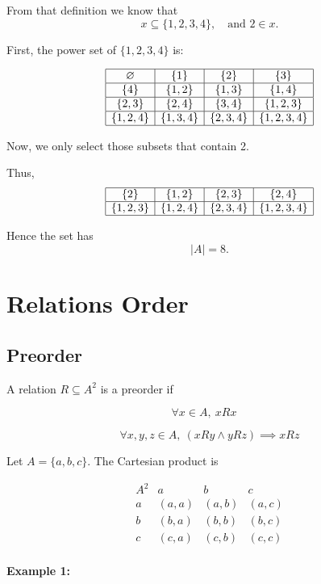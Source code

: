 \documentclass[12pt,a4paper,openany]{article}
\begin{document}
From that definition we know that  
\[
x \subseteq \{1,2,3,4\}, \quad \text{and } 2 \in x.
\]  

First, the power set of $\{1,2,3,4\}$ is:

\[
\begin{array}{|c|c|c|c|}
\hline
\varnothing & \{1\} & \{2\} & \{3\} \\ \hline
\{4\} & \{1,2\} & \{1,3\} & \{1,4\} \\ \hline
\{2,3\} & \{2,4\} & \{3,4\} & \{1,2,3\} \\ \hline
\{1,2,4\} & \{1,3,4\} & \{2,3,4\} & \{1,2,3,4\} \\ \hline
\end{array}
\]

Now, we only select those subsets that contain 2.  

Thus,  
\[
\begin{array}{|c|c|c|c|}
\hline
\{2\} & \{1,2\} & \{2,3\} & \{2,4\} \\ \hline
\{1,2,3\} & \{1,2,4\} & \{2,3,4\} & \{1,2,3,4\} \\ \hline
\end{array}
\]

Hence the set has  
\[
\boxed{|A| = 8.}
\]

\section{Relations Order }

\subsection{Preorder}

A relation $R \subseteq A^2$ is a preorder if

$$
\forall x \in A, \ xRx \quad
$$

$$
\forall x,y,z \in A, \ (xRy \land yRz) \implies xRz
$$

Let $A = \{a,b,c\}$. The Cartesian product is

$$
\begin{array}{c|ccc}
A^2 & a & b & c \\
\hline
a & (a,a) & (a,b) & (a,c) \\
b & (b,a) & (b,b) & (b,c) \\
c & (c,a) & (c,b) & (c,c) \\
\end{array}
$$

\textbf{Example 1:}
\end{document}
